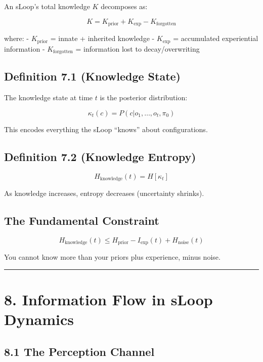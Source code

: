 \documentclass[
  11pt,
  letterpaper,
  twoside,
  openright]{book}
\begin{document}
An sLoop's total knowledge \(K\) decomposes as:

\[K = K_{\text{prior}} + K_{\text{exp}} - K_{\text{forgotten}}\]

where: - \(K_{\text{prior}}\) = innate + inherited knowledge -
\(K_{\text{exp}}\) = accumulated experiential information -
\(K_{\text{forgotten}}\) = information lost to decay/overwriting

\subsection{Definition 7.1 (Knowledge
State)}\label{definition-7.1-knowledge-state}

The knowledge state at time \(t\) is the posterior distribution:

\[\kappa_t(c) = P(c | o_1, \ldots, o_t, \pi_0)\]

This encodes everything the sLoop ``knows'' about configurations.

\subsection{Definition 7.2 (Knowledge
Entropy)}\label{definition-7.2-knowledge-entropy}

\[H_{\text{knowledge}}(t) = H[\kappa_t]\]

As knowledge increases, entropy decreases (uncertainty shrinks).

\subsection{The Fundamental
Constraint}\label{the-fundamental-constraint}

\[H_{\text{knowledge}}(t) \leq H_{\text{prior}} - I_{\text{exp}}(t) + H_{\text{noise}}(t)\]

You cannot know more than your priors plus experience, minus noise.

\begin{center}\rule{0.5\linewidth}{0.5pt}\end{center}

\section{8. Information Flow in sLoop
Dynamics}\label{information-flow-in-sloop-dynamics}

\subsection{8.1 The Perception Channel}\label{the-perception-channel}
\end{document}
